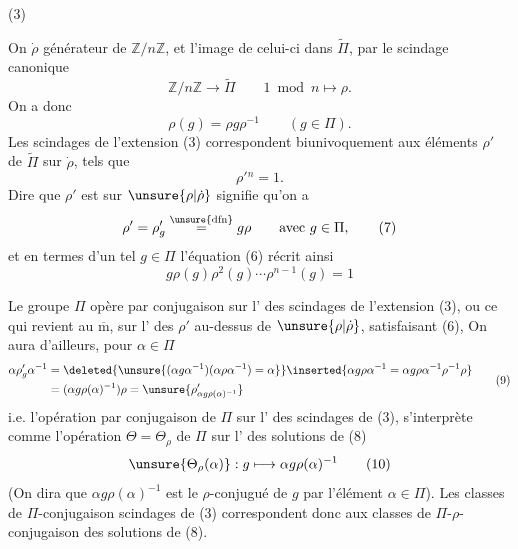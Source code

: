 \begin{samepage}
(3) 
\end{samepage}

On  $\dot\rho$  générateur de $\mathbb Z/n\mathbb Z$, et   l'image de celui-ci dans $\widetilde\Pi$, par le scindage canonique 
\[
\mathbb Z/n\mathbb Z\longrightarrow\widetilde\Pi\qquad 1\bmod n\longmapsto\rho. \tag{4}
\]
On a donc
\[
\rho(g)=\rho g\rho^{-1}\qquad(g\in\Pi). \tag{5}
\]
Les scindages de l'extension (3) correspondent biunivoquement aux éléments $\rho'$ de $\widetilde\Pi$ sur $\dot\rho$, tels que
\[
\rho'{}^n=1. \tag{6}
\]
Dire que $\rho'$ est sur $\unsure{\rho|\dot\rho}$ signifie qu'on a
\[
\rho'=\rho'_g\overset{\unsure{\mathrm{dfn}}}{=}g\rho\qquad\text{avec }g\in\Pi, \tag{7}
\]
et en termes d'un tel $g\in\Pi$ l'équation (6)  récrit ainsi
\[
\boxed{g\rho(g)\rho^2(g)\cdots\rho^{n-1}(g)=1} \tag{8}
\]






Le groupe $\Pi$ opère par conjugaison sur l' des scindages de l'extension (3), ou ce qui revient au $\overline{\mathrm m}$, sur l' des $\rho'$ au-dessus de $\unsure{\rho|\dot\rho}$, satisfaisant (6),  On aura d'ailleurs, pour $\alpha\in\Pi$
\[
\begin{aligned}
\alpha\rho'_g\alpha^{-1}
&=\deleted{\unsure{(\alpha g\alpha^{-1})(\alpha\rho\alpha^{-1})=\alpha}}\inserted{\alpha g\rho\alpha^{-1}=\alpha g\rho\alpha^{-1}\rho^{-1}\rho}\\
&=(\alpha g\rho(\alpha)^{-1})\rho
=\unsure{\rho'_{\alpha g\rho(\alpha)^{-1}}}
\end{aligned}\tag{9}
\]
i.e. l'opération par conjugaison de $\Pi$ sur l' des scindages de (3), s'interprète comme l'opération $\Theta=\Theta_\rho$ de $\Pi$ sur l' des solutions de (8) 
\[
\unsure{\Theta_\rho(\alpha)}:g\longmapsto\alpha g\rho(\alpha)^{-1} \tag{10}
\]
(On dira que $\alpha g\rho(\alpha)^{-1}$ est le $\rho$-conjugué de $g$ par l'élément $\alpha\in\Pi$). Les classes de $\Pi$-conjugaison  scindages de (3) correspondent donc aux classes de $\Pi$-$\rho$-conjugaison des solutions de (8).

